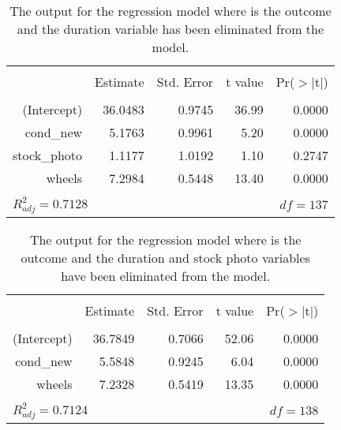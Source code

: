 \begin{table}[ht]
\centering
\begin{tabular}{rrrrr}
  \hline
  \vspace{-3.7mm} & & & & \\
 & Estimate & Std. Error & t value & Pr($>$$|$t$|$) \\ 
  \hline
  \vspace{-3.8mm} & & & & \\
(Intercept) & 36.0483 & 0.9745 & 36.99 & 0.0000 \\ 
  cond\_\hspace{0.3mm}new & 5.1763 & 0.9961 & 5.20 & 0.0000 \\ 
  stock\_\hspace{0.3mm}photo & 1.1177 & 1.0192 & 1.10 & 0.2747 \\ 
  wheels & 7.2984 & 0.5448 & 13.40 & 0.0000 \\ 
   \hline
  \vspace{-3.6mm} & & & & \\
\multicolumn{3}{l}{$R_{adj}^2 = 0.7128$}&&\small$df=137$
\end{tabular}
\caption{The output for the regression model where  is the outcome and the duration variable has been eliminated from the model.}
\label{outputForMultipleRegrOutputForAllPredictorsButDuration}
\end{table}

\begin{table}[ht]
\centering
\begin{tabular}{rrrrr}
  \hline
  \vspace{-3.7mm} & & & & \\
 & Estimate & Std. Error & t value & Pr($>$$|$t$|$) \\ 
  \hline
  \vspace{-3.8mm} & & & & \\
(Intercept) & 36.7849 & 0.7066 & 52.06 & 0.0000 \\ 
  cond\_\hspace{0.3mm}new & 5.5848 & 0.9245 & 6.04 & 0.0000 \\ 
  wheels & 7.2328 & 0.5419 & 13.35 & 0.0000 \\ 
   \hline
  \vspace{-3.6mm} & & & & \\
\multicolumn{3}{l}{$R_{adj}^2 = 0.7124$}&&\small$df=138$
\end{tabular}
\caption{The output for the regression model where  is the outcome and the duration and stock photo variables have been eliminated from the model.}
\label{outputForMultipleRegrOutputForAllPredictorsButDurationAndStockPhoto}
\end{table}

